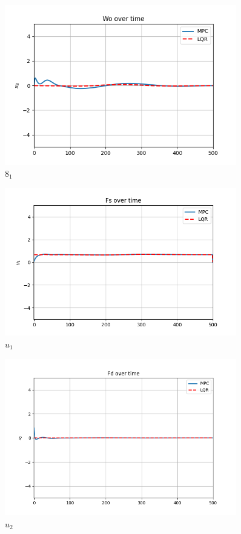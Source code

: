 \begin{figure}[H]
\centering
\includegraphics[width=0.9\textwidth]{pictures/mpc8.png}
\caption{$8_1$}
\label{fig:mpc8}
\end{figure}

\begin{figure}[H]
\centering
\includegraphics[width=0.9\textwidth]{pictures/mpc9.png}
\caption{$u_1$}
\label{fig:mpc9}
\end{figure}

\begin{figure}[H]
\centering
\includegraphics[width=0.9\textwidth]{pictures/mpc10.png}
\caption{$u_2$}
\label{fig:mpc10}
\end{figure}
 
